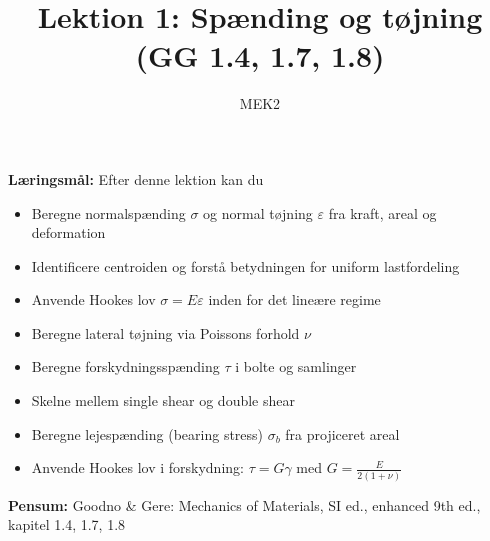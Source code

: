 

\renewcommand{\hdtitel}{MEK2 Læseguide --- Lektion 1: Spænding og tøjning}

\title{Lektion 1: Spænding og tøjning (GG 1.4, 1.7, 1.8)}
\author{MEK2}
\date{}



\maketitle

\begin{spgbox}
\textbf{Læringsmål:} Efter denne lektion kan du
\begin{itemize}
  \item Beregne normalspænding $\sigma$ og normal tøjning $\varepsilon$ fra kraft, areal og deformation
  \item Identificere centroiden og forstå betydningen for uniform lastfordeling
  \item Anvende Hookes lov $\sigma = E\varepsilon$ inden for det lineære regime
  \item Beregne lateral tøjning via Poissons forhold $\nu$
  \item Beregne forskydningsspænding $\tau$ i bolte og samlinger
  \item Skelne mellem single shear og double shear
  \item Beregne lejespænding (bearing stress) $\sigma_b$ fra projiceret areal
  \item Anvende Hookes lov i forskydning: $\tau = G\gamma$ med $G = \frac{E}{2(1+\nu)}$
\end{itemize}
\end{spgbox}

\begin{refbox}
\textbf{Pensum:} Goodno \& Gere: Mechanics of Materials, SI ed., enhanced 9th ed., kapitel 1.4, 1.7, 1.8
\end{refbox}

\clearpage

